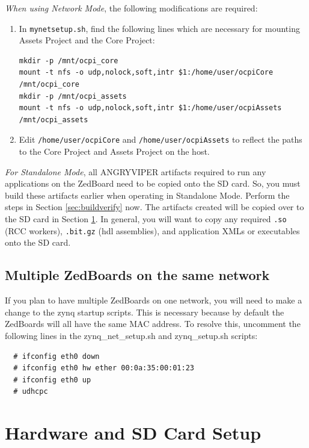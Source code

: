 \begin{flushleft}
\textit{When using Network Mode}, the following modifications are required:
\end{flushleft}

\begin{enumerate}
\item In \texttt{mynetsetup.sh}, find the following lines which are necessary for mounting Assets Project and the Core Project:
\begin{verbatim}
mkdir -p /mnt/ocpi_core
mount -t nfs -o udp,nolock,soft,intr $1:/home/user/ocpiCore /mnt/ocpi_core
mkdir -p /mnt/ocpi_assets
mount -t nfs -o udp,nolock,soft,intr $1:/home/user/ocpiAssets /mnt/ocpi_assets
\end{verbatim}
 \item Edit \texttt{/home/user/ocpiCore} and \texttt{/home/user/ocpiAssets} to reflect the paths to the Core Project and Assets Project on the host. \\
\end{enumerate}

\label{sec:buildNow}
\textit{For Standalone Mode}, all ANGRYVIPER artifacts required to run any applications on the ZedBoard need to be copied onto the SD card.  So, you must build these artifacts earlier when operating in Standalone Mode. Perform the steps in Section \ref{sec:buildverify}  now. The artifacts created will be copied over to the SD card in Section \ref{sec:HW_Setup}. In general, you will want to copy any required \texttt{.so} (RCC workers), \texttt{.bit.gz} (hdl assemblies), and application XMLs or executables onto the SD card.

\subsection{Multiple ZedBoards on the same network}
If you plan to have multiple ZedBoards on one network, you will need to make a change to the zynq startup scripts. This is necessary because by default the ZedBoards will all have the same MAC address. To resolve this, uncomment the following lines in the zynq\_net\_setup.sh and zynq\_setup.sh scripts:
\begin{verbatim}
  # ifconfig eth0 down
  # ifconfig eth0 hw ether 00:0a:35:00:01:23
  # ifconfig eth0 up
  # udhcpc
\end{verbatim}
\section{Hardware and SD Card Setup}
\label{sec:HW_Setup}
